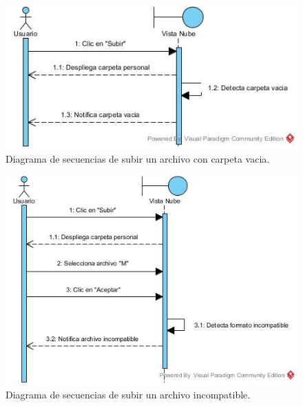 \begin{figure}[htbp!]
		\centering
			\includegraphics[width=1\textwidth]{images/Subir_trayectoria_a}
		\caption{Diagrama de secuencias de subir un archivo con carpeta vacia.}
\end{figure}

\begin{figure}[htbp!]
		\centering
			\includegraphics[width=1\textwidth]{images/Subir_trayectoria_b}
		\caption{Diagrama de secuencias de subir un archivo incompatible.}
\end{figure}

